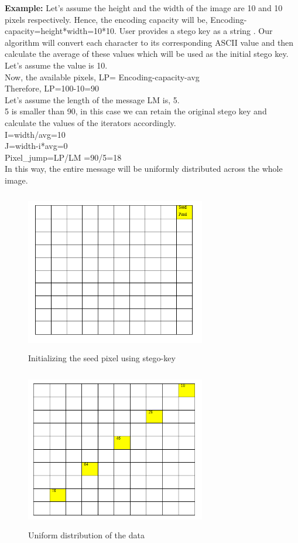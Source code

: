 \documentclass{report}
\begin{document}
\textbf{Example:}
Let’s assume the height and the width of the image are 10 and 10 pixels respectively. Hence, the encoding capacity will be, Encoding-capacity=height*width=10*10. User provides a stego key as a string . Our algorithm will convert each character to its corresponding ASCII value and then calculate the average of these values which will be used as the initial stego key.  Let’s assume the value is 10.\\
Now, the available pixels, LP= Encoding-capacity-avg\\
Therefore, LP=100-10=90\\
Let’s assume the length of the message LM is, 5.\\
5 is smaller than 90, in this case we can retain the original stego key and calculate the values of the iterators accordingly.\\
I=width/avg=10\\
J=width-i*avg=0\\
Pixel\_jump=LP/LM =90/5=18\\
In this way, the entire message will be uniformly distributed across the whole image.

\begin{figure}[htbp]
  \centering
  \includegraphics[width=0.7\textwidth, height=7cm]{Screenshot (355).png} 
  \caption{Initializing the seed pixel using stego-key}
  \label{fig:6}
\end{figure}

\begin{figure}[htbp]
  \centering
  \includegraphics[width=0.7\textwidth, height=7cm]{Screenshot (357).png} 
  \caption{Uniform distribution of the data}
  \label{fig:7}
\end{figure}
\end{document}
